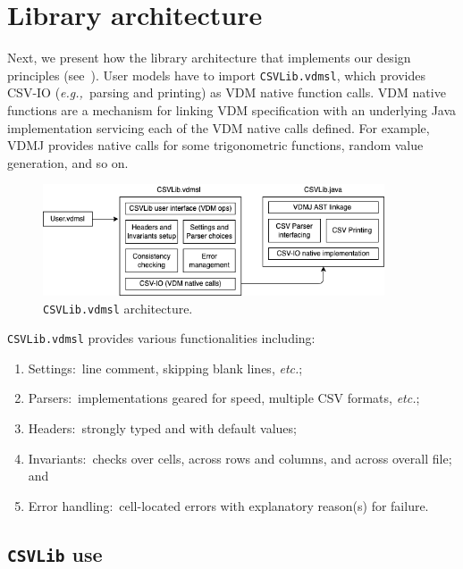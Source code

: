 \documentclass[runningheads,a4paper]{llncs}
\begin{document}

\section{Library architecture}\label{sec:architecture}

Next, we present how the library architecture that implements our design principles (see~). User models have to import \texttt{CSVLib.vdmsl}, which provides CSV-IO (\textit{e.g.,}~parsing and printing) as VDM native function calls. VDM native functions are a mechanism for linking VDM specification with an underlying Java implementation servicing each of the VDM native calls defined. For example, VDMJ provides native calls for some trigonometric functions, random value generation, and so on.  

\begin{figure}[htbp]
   \centering
       \includegraphics[width=0.90\textwidth]{figures/CSVLibArchitecture.png}
   \caption{\texttt{CSVLib.vdmsl} architecture.}\label{fig:CSVLibArchitecture}
\end{figure}

\noindent\texttt{CSVLib.vdmsl} provides various functionalities including:
%
\begin{enumerate}
    \item Settings:~line comment, skipping blank lines, \textit{etc.};
    \item Parsers:~implementations geared for speed, multiple CSV formats, \textit{etc.};
    \item Headers:~strongly typed and with default values;
    \item Invariants:~checks over cells, across rows and columns, and across overall file; and
    \item Error handling:~cell-located errors with explanatory reason(s) for failure.
\end{enumerate} 

\subsection*{\texttt{CSVLib} use}
\end{document}
